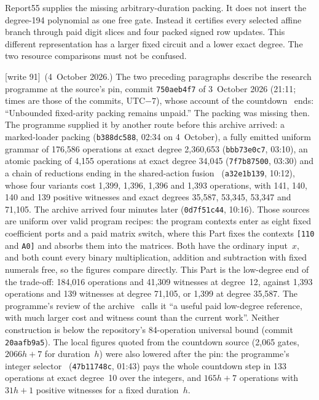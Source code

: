 \documentclass[11pt,letterpaper]{article}
\theoremstyle{definition}
\theoremstyle{remark}
\newcommand{\wtagd}{\textup{[write 91]}}
\begin{document}
Report55 supplies the missing arbitrary-duration packing. It does not insert the degree-194 polynomial as one free gate. Instead it certifies every selected affine branch through paid digit slices and four packed signed row updates. This different representation has a larger fixed circuit and a lower exact degree. The two resource comparisons must not be confused.

\wtagd\ (4~October 2026.) The two preceding paragraphs describe the research programme at the source's pin, commit \texttt{750aeb4f7} of 3~October 2026 (21:11; times are those of the commits, UTC$-7$), whose account of the countdown~\cite{cm-countdown} ends: ``Unbounded fixed-arity packing remains unpaid.'' The packing was missing then. The programme supplied it by another route before this archive arrived: a marked-loader packing (\texttt{b388dc588}, 02:34 on 4~October), a fully emitted uniform grammar of 176,586 operations at exact degree 2,360,653 (\texttt{bbb73e0c7}, 03:10), an atomic packing of 4,155 operations at exact degree 34,045 (\texttt{7f7b87500}, 03:30) and a chain of reductions ending in the shared-action fusion~\cite{repo-fusion} (\texttt{a32e1b139}, 10:12), whose four variants cost 1,399, 1,396, 1,396 and 1,393 operations, with 141, 140, 140 and 139 positive witnesses and exact degrees 35,587, 53,345, 53,347 and 71,105. The archive arrived four minutes later (\texttt{0d7f51c44}, 10:16). Those sources are uniform over valid program recipes: the program contexts enter as eight fixed coefficient ports and a paid matrix switch, where this Part fixes the contexts \texttt{[110} and \texttt{A0]} and absorbs them into the matrices. Both have the ordinary input~$x$, and both count every binary multiplication, addition and subtraction with fixed numerals free, so the figures compare directly. This Part is the low-degree end of the trade-off: 184,016 operations and 41,309 witnesses at degree~12, against 1,393 operations and 139 witnesses at degree 71,105, or 1,399 at degree 35,587. The programme's review of the archive~\cite{repo-revcm} calls it ``a useful paid low-degree reference, with much larger cost and witness count than the current work''. Neither construction is below the repository's 84-operation universal bound (commit \texttt{20aafb9a5}). The local figures quoted from the countdown source (2,065 gates, $2066h+7$ for duration~$h$) were also lowered after the pin: the programme's integer selector~ (\texttt{47b11748c}, 01:43) pays the whole countdown step in 133 operations at exact degree~10 over the integers, and $165h+7$ operations with $31h+1$ positive witnesses for a fixed duration~$h$.
\end{document}
